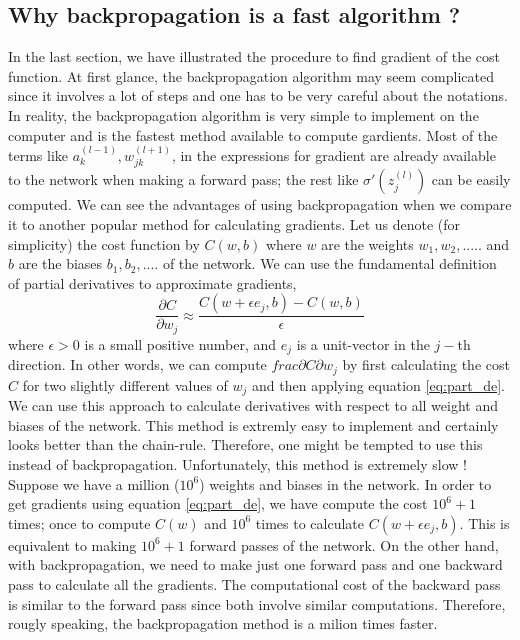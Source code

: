 \subsection{Why backpropagation is a fast algorithm ?}
In the last section, we have illustrated the procedure to find gradient of the cost function. At first glance, the backpropagation algorithm may
seem complicated since it involves a lot of steps and one has to be very careful about the notations. In reality, the backpropagation algorithm is very 
simple to implement on the computer and is the fastest method available to compute gardients. Most of the terms like $a_k^{(l-1)}, w_{jk}^{(l+1)}$, in 
the expressions for gradient are already available to the network when making a forward pass; the rest like $\sigma'(z_j^{(l)})$ can be easily computed.
We can see the advantages of using backpropagation when we compare it to another popular method for calculating gradients. Let us denote (for simplicity) the cost function by $C(w,b)$ 
where $w$ are the weights $w_1,w_2,.....$ and $b$ are the biases $b_1,b_2,....$ of the network. We can use the fundamental definition of partial derivatives to approximate gradients,
\begin{equation}
    \label{eq:part_de}
    \frac{\partial C}{\partial w_j} \approx \frac{C(w + \epsilon e_j, b) - C(w,b)}{\epsilon}
\end{equation}
where $\epsilon > 0$ is a small positive number, and $e_j$ is a unit-vector in the $j-$th direction. In other words, we can compute $frac{\partial C}{\partial w_j}$ by first 
calculating the cost $C$ for two slightly  different values of $w_j$ and then applying equation \eqref{eq:part_de}. We can use this approach to 
calculate derivatives with respect to all weight and biases of the network. This method is extremly easy to implement and certainly looks better than the chain-rule. Therefore, one
might be tempted to use this instead of backpropagation. Unfortunately, this method is extremely slow ! Suppose we have a million ($10^6$) weights and biases in the network. In order to get 
gradients using equation \eqref{eq:part_de}, we have compute the cost $10^6 + 1$ times; once to compute $C(w)$ and $10^6$ times to calculate $C(w + \epsilon e_j, b)$. This is equivalent to making
$10^6 +1$ forward passes of the network. On the other hand, with backpropagation, we need to make just one forward pass and one backward pass to calculate all the gradients. The computational cost 
of the backward pass is similar to the forward pass since both involve similar computations. Therefore, rougly speaking, the backpropagation method is a milion times faster. 
